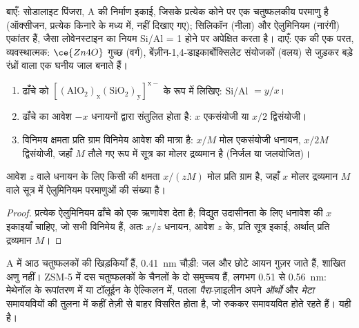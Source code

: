 \begin{omfigure}
{\small बाएँ: सोडालाइट पिंजरा,  A की निर्माण इकाई, जिसके
प्रत्येक कोने पर एक चतुष्फलकीय परमाणु है (ऑक्सीजन, प्रत्येक किनारे के मध्य में,
नहीं दिखाए गए); सिलिकॉन (नीला) और ऐलुमिनियम (नारंगी) एकांतर हैं, जैसा लोवेनस्टाइन का नियम
Si/Al = 1 होने पर अपेक्षित करता है। दाएँ: एक  की एक परत,
व्यवस्थात्मक: $\ce{Zn4O}$ गुच्छ (वर्ग), बेंज़ीन-1,4-डाइकार्बोक्सिलेट
संयोजकों (वलय) से जुड़कर बड़े रंध्रों वाला एक घनीय जाल बनाते हैं।}
\end{omfigure}

\begin{method}[ज़िओलाइट का सूत्र और विनिमय क्षमता]\label{met:b3:inorganic-materials:zeolite-formula}
\begin{enumerate}
  \item ढाँचे को $\mathrm{[(AlO_2)_x(SiO_2)_y]^{x-}}$ के रूप में लिखिए: Si/Al $= y/x$।
  \item ढाँचे का आवेश $-x$ धनायनों द्वारा संतुलित होता है: $x$ एकसंयोजी या $x/2$
        द्विसंयोजी।
  \item विनिमय क्षमता प्रति ग्राम विनिमेय आवेश की मात्रा है:
        $x/M$ मोल एकसंयोजी धनायन, $x/2M$ द्विसंयोजी, जहाँ $M$ तौले गए रूप में सूत्र का
        मोलर द्रव्यमान है (निर्जल या जलयोजित)।
\end{enumerate}
\end{method}

\begin{proposition}[विनिमय क्षमता]\label{prop:b3:inorganic-materials:exchange-capacity}
आवेश $z$ वाले धनायन के लिए किसी  की क्षमता $x/(zM)$ मोल प्रति ग्राम है,
जहाँ $x$ मोलर द्रव्यमान $M$ वाले सूत्र में ऐलुमिनियम परमाणुओं की संख्या है।
\end{proposition}

\begin{proof}
प्रत्येक ऐलुमिनियम ढाँचे को एक ऋणावेश देता है; विद्युत
उदासीनता के लिए धनावेश की $x$ इकाइयाँ चाहिए, जो सभी विनिमेय हैं, अतः
$x/z$ धनायन, आवेश $z$ के, प्रति सूत्र इकाई, अर्थात् प्रति द्रव्यमान $M$।
\end{proof}

 A में आठ चतुष्फलकों की खिड़कियाँ हैं, \qty{0.41}{nm} चौड़ी: जल और छोटे
आयन गुज़र जाते हैं, शाखित अणु नहीं। ZSM-5 में दस
चतुष्फलकों के चैनलों के दो समुच्चय हैं, लगभग 0.51 से \qty{0.56}{nm}: मेथेनॉल के रूपांतरण में या
टॉलूईन के ऐल्किलन में, पतला \textit{पैरा}-ज़ाइलीन अपने \textit{ऑर्थो} और \textit{मेटा} समावयवियों की तुलना में
कहीं तेज़ी से बाहर विसरित होता है, जो रुककर समावयवित होते रहते हैं। यही  है।

